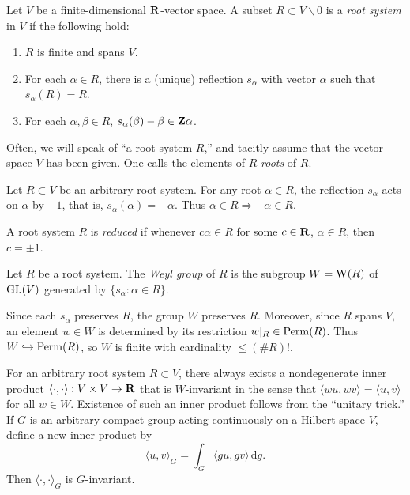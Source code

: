 \begin{definition}
Let $V$ be a finite-dimensional $\mathbf{R}$-vector space. A subset 
$R\subset V\smallsetminus 0$ is a \emph{root system} in $V$ if the following 
hold:
\begin{enumerate}
  \item $R$ is finite and spans $V$. 
  \item For each $\alpha\in R$, there is a (unique) reflection $s_\alpha$ with 
    vector $\alpha$ such that $s_\alpha(R) = R$. 
  \item For each $\alpha,\beta\in R$, $s_\alpha(\beta)-\beta\in \mathbf{Z}\alpha$. 
\end{enumerate}
\end{definition}

Often, we will speak of ``a root system $R$,'' and tacitly assume that the 
vector space $V$ has been given. One calls the elements of $R$ \emph{roots} 
of $R$. 

Let $R\subset V$ be an arbitrary root system. For any root $\alpha\in R$, the 
reflection $s_\alpha$ acts on $\alpha$ by $-1$, that is, 
$s_\alpha(\alpha)=-\alpha$. Thus $\alpha\in R\Rightarrow -\alpha\in R$. 

\begin{definition}
A root system $R$ is \emph{reduced} if whenever $c\alpha\in R$ for some 
$c\in \mathbf{R}$, $\alpha\in R$, then $c=\pm 1$. 
\end{definition}

\begin{definition}
Let $R$ be a root system. The \emph{Weyl group} of $R$ is the subgroup 
$W=\operatorname{W}(R)$ of $\operatorname{GL}(V)$ generated by $\{s_\alpha:\alpha\in R\}$. 
\end{definition}

Since each $s_\alpha$ preserves $R$, the group $W$ preserves $R$. Moreover, 
since $R$ spans $V$, an element $w\in W$ is determined by its restriction 
$w|_R\in \operatorname{Perm}(R)$. Thus $W\hookrightarrow \operatorname{Perm}(R)$, so $W$ is finite 
with cardinality $\leqslant (\# R)!$. 

For an arbitrary root system $R\subset V$, there always exists a nondegenerate 
inner product $\langle\cdot,\cdot\rangle:V\times V\to \mathbf{R}$ that is 
$W$-invariant in the sense that $\langle w u,w v\rangle = \langle u,v\rangle$ 
for all $w\in W$. Existence of such an inner product follows from the 
``unitary trick.'' If $G$ is an arbitrary compact group acting continuously 
on a Hilbert space $V$, define a new inner product by 
\[
  \langle u,v\rangle_G = \int_G \langle g u,g v\rangle\, \mathrm{d} g .
\]
Then $\langle\cdot,\cdot\rangle_G$ is $G$-invariant. 

